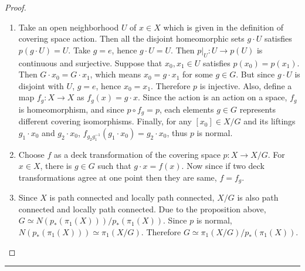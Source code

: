 \begin{proof}
\begin{enumerate}
\item Take an open neighborhood $U$ of $x\in X$ which is given in the definition of covering space action. Then all the disjoint homeomorphic sets $g\cdot U$ satisfies $p(g\cdot U)=U$. Take $g=e$, hence $g\cdot U=U$. Then $p|_U:U\rightarrow p(U)$ is continuous and surjective. Suppose that $x_0,x_1\in U$ satisfies $p(x_0)=p(x_1)$. Then $G\cdot x_0=G\cdot x_1$, which means $x_0=g\cdot x_1$ for some $g\in G$. But since $g\cdot U$ is disjoint with $U$, $g=e$, hence $x_0=x_1$. Therefore $p$ is injective. Also, define a map $f_g:X\rightarrow X$ as $f_g(x)=g\cdot x$. Since the action is an action on a space, $f_g$ is homeomorphism, and since $p\circ f_g=p$, each elements $g\in G$ represents different covering isomorphisms. Finally, for any $[x_0]\in X/G$ and its liftings $g_1\cdot x_0$ and $g_2\cdot x_0$, $f_{g_2g_1^{-1}}(g_1\cdot x_0)=g_2\cdot x_0$, thus $p$ is normal.
\item Choose $f$ as a deck transformation of the covering space $p:X\rightarrow X/G$. For $x\in X$, there is $g\in G$ such that $g\cdot x=f(x)$. Now since if two deck transformations agree at one point then they are same, $f=f_g$.
\item Since $X$ is path connected and locally path connected, $X/G$ is also path connected and locally path connected. Due to the proposition above, $G\simeq N(p_*(\pi_1(X)))/p_*(\pi_1(X))$. Since $p$ is normal, $N(p_*(\pi_1(X)))\simeq \pi_1(X/G)$. Therefore $G\simeq \pi_1(X/G)/p_*(\pi_1(X))$.
\end{enumerate}
\end{proof}
\noindent\rule{\textwidth}{1pt}
\newline